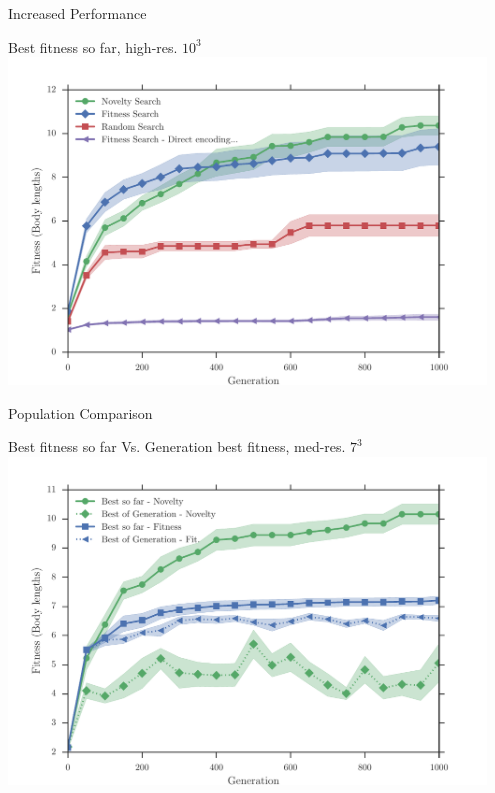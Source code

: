 \documentclass[6pt]{beamer}
\begin{document}
{\begin{frame}{Increased Performance}
\begin{block}{Best fitness so far, high-res. $10^3$}
\centering
\includegraphics[width=0.95\textwidth]{../Figures/Results/FitvsNovVsDirSize10.pdf}
\end{block}
\end{frame}

\begin{frame}{Population Comparison}
\begin{block}{Best fitness so far Vs. Generation best fitness, med-res. $7^3$}
\centering
\includegraphics[width=0.95\textwidth]{../Figures/Results/AvgGenerChampNoveltyFitnessSize7.pdf}
\end{block}
\end{frame}

}
\end{document}
